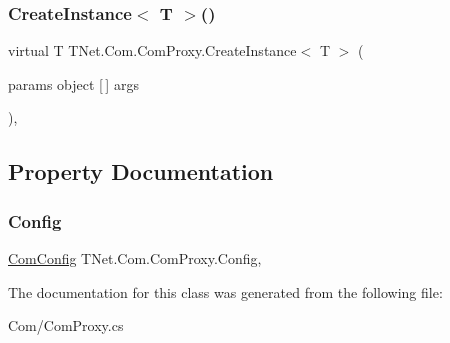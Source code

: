\subsubsection{\texorpdfstring{Create\+Instance$<$ T $>$()}{CreateInstance< T >()}}
{\footnotesize\ttfamily virtual T T\+Net.\+Com.\+Com\+Proxy.\+Create\+Instance$<$ T $>$ (\begin{DoxyParamCaption}\item[{params object \mbox{[}$\,$\mbox{]}}]{args }\end{DoxyParamCaption})\hspace{0.3cm}{\ttfamily [protected]}, {\ttfamily [virtual]}}







\subsection{Property Documentation}
\mbox{\label{class_t_net_1_1_com_1_1_com_proxy_a42536aa6b4c1dbc50f6e7929c9937db5}} 
\subsubsection{\texorpdfstring{Config}{Config}}
{\footnotesize\ttfamily \mbox{\hyperlink{class_t_net_1_1_com_1_1_com_config}{Com\+Config}} T\+Net.\+Com.\+Com\+Proxy.\+Config\hspace{0.3cm}{\ttfamily [get]}, {\ttfamily [set]}}







The documentation for this class was generated from the following file\+:\begin{DoxyCompactItemize}
\item 
Com/Com\+Proxy.\+cs\end{DoxyCompactItemize}

